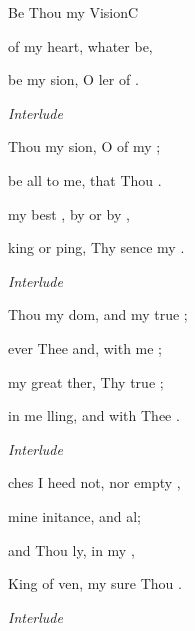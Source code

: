 \documentclass[12pt]{book}
\begin{document}
\begin{song}{Be Thou my Vision}{C}{}{}{}{}
\begin{SBVerse}
     of my  heart, whater be,

     be my sion, O ler of .

    \emph{Interlude} \Ch{[}{}    \Ch{]}{}
  \end{SBVerse}

  \begin{SBExtraKeys}{
  \CBPageBrk

  \begin{SBVerse}
     Thou my sion, O  of my ;

     be all  to me,  that Thou .

     my best , by  or by ,

    king or ping, Thy sence my .

    \emph{Interlude} \Ch{[}{}    \Ch{]}{}
  \end{SBVerse}

  \begin{SBVerse}
     Thou my dom, and  my true ;

     ever  Thee and,  with me ;

     my great ther,  Thy true ;

     in me lling, and  with Thee .

    \emph{Interlude} \Ch{[}{}    \Ch{]}{}
  \end{SBVerse}


  \begin{SBVerse}
    ches I heed  not, nor  empty ,

     mine initance,  and al;

     and Thou ly,  in my ,

     King of ven, my sure Thou .

    \emph{Interlude} \Ch{[}{}   \Ch{D]}{change}
  \end{SBVerse}


}
\end{SBExtraKeys}
\end{song}
\end{document}
